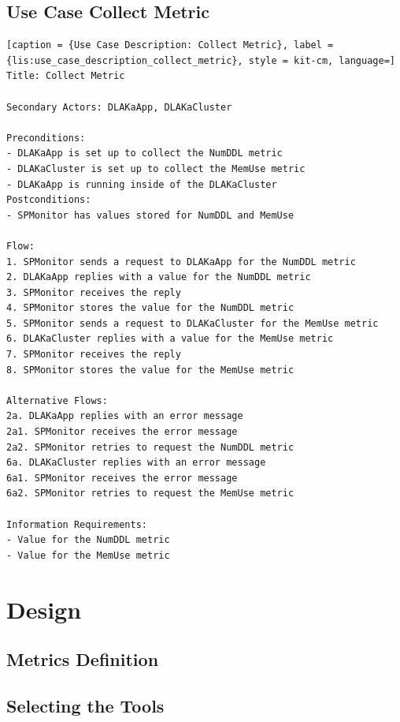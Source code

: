 \subsection{Use Case Collect Metric}

\begin{lstlisting}[caption = {Use Case Description: Collect Metric}, label = {lis:use_case_description_collect_metric}, style = kit-cm, language=]
Title: Collect Metric

Secondary Actors: DLAKaApp, DLAKaCluster

Preconditions:
- DLAKaApp is set up to collect the NumDDL metric
- DLAKaCluster is set up to collect the MemUse metric
- DLAKaApp is running inside of the DLAKaCluster
Postconditions:
- SPMonitor has values stored for NumDDL and MemUse

Flow:
1. SPMonitor sends a request to DLAKaApp for the NumDDL metric
2. DLAKaApp replies with a value for the NumDDL metric
3. SPMonitor receives the reply
4. SPMonitor stores the value for the NumDDL metric
5. SPMonitor sends a request to DLAKaCluster for the MemUse metric
6. DLAKaCluster replies with a value for the MemUse metric
7. SPMonitor receives the reply
8. SPMonitor stores the value for the MemUse metric

Alternative Flows:
2a. DLAKaApp replies with an error message
2a1. SPMonitor receives the error message
2a2. SPMonitor retries to request the NumDDL metric
6a. DLAKaCluster replies with an error message
6a1. SPMonitor receives the error message
6a2. SPMonitor retries to request the MemUse metric

Information Requirements:
- Value for the NumDDL metric
- Value for the MemUse metric
\end{lstlisting}


\section{Design}


\subsection{Metrics Definition}

\subsection{Selecting the Tools}

